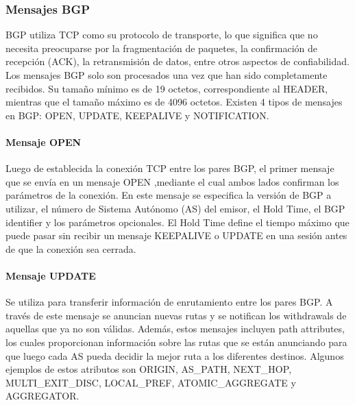 

\subsubsection{Mensajes BGP}  \label{sec:anexo_mensajes_bgp}

BGP utiliza TCP \cite{RFC793-TCP} como su protocolo de transporte, lo que significa que no necesita preocuparse por la fragmentación de paquetes, la confirmación de recepción (ACK), la retransmisión de datos, entre otros aspectos de confiabilidad.\\

Los mensajes BGP solo son procesados una vez que han sido completamente recibidos. Su tamaño mínimo es de 19 octetos, correspondiente al HEADER, mientras que el tamaño máximo es de 4096 octetos. Existen 4 tipos de mensajes en BGP: OPEN, UPDATE, KEEPALIVE y NOTIFICATION.\\


\paragraph{Mensaje OPEN}


Luego de establecida la conexión TCP entre los pares BGP, el primer mensaje que se envía en un mensaje OPEN ,mediante 
el cual ambos lados confirman los parámetros de la conexión.
En este mensaje se especifica la versión de BGP a utilizar, el número de Sistema Autónomo (AS) del emisor, el Hold Time, 
el BGP identifier y los parámetros opcionales.
El Hold Time define el tiempo máximo que puede pasar sin recibir un mensaje KEEPALIVE o UPDATE en una sesión antes de que 
la conexión sea cerrada.\\



\paragraph{Mensaje UPDATE}

Se utiliza para transferir información de enrutamiento entre los pares BGP. A través de este mensaje se 
anuncian nuevas rutas y se notifican los withdrawals de aquellas que ya no son válidas.
Además, estos mensajes incluyen path attributes, los cuales proporcionan información sobre las rutas que 
se están anunciando para que luego cada AS pueda decidir la mejor ruta a los diferentes destinos. 
Algunos ejemplos de estos atributos son ORIGIN, AS\_PATH, NEXT\_HOP, MULTI\_EXIT\_DISC, LOCAL\_PREF, ATOMIC\_AGGREGATE y AGGREGATOR.\\



